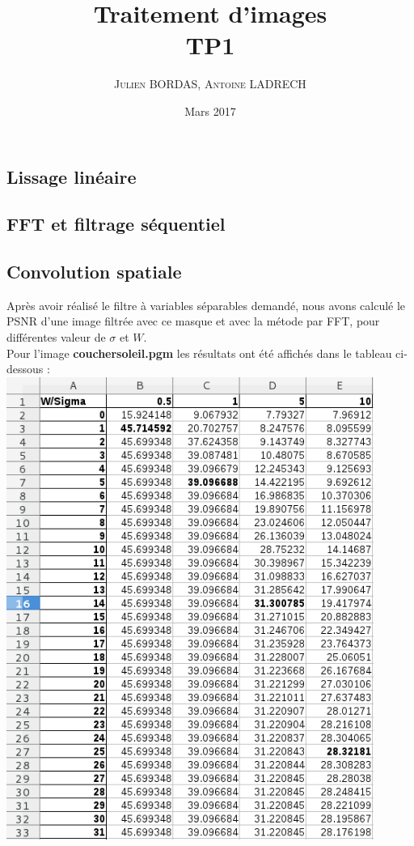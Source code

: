 \documentclass[a4,12pt]{article}
\title{\textbf{Traitement d'images \\ TP1}}
\author{
  \begin{tabular}{cc}
    \textsc{Julien BORDAS, Antoine LADRECH}
  \end{tabular}}
\date{\small Mars 2017}
\begin{document}
\maketitle

\begin{mdframed}[style=exampledefault]
  \section{Lissage linéaire}
\end{mdframed}

\subsection{FFT et filtrage séquentiel}

\begin{shaded}
\end{shaded}

\subsection{Convolution spatiale}

\begin{shaded}
Après avoir réalisé le filtre à variables séparables demandé, nous avons calculé le PSNR d'une image filtrée avec ce masque et avec la métode par FFT, pour différentes valeur de $\sigma$ et $W$.\\

Pour l'image \textbf{couchersoleil.pgm} les résultats ont été affichés dans le tableau ci-dessous :
\center
\includegraphics[width=12cm]{part1_2couchersoleil.png}

\end{shaded}
\end{document}
